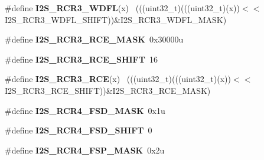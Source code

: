 \begin{DoxyCompactItemize}
\item 
\hypertarget{group___i2_s___register___masks_ga9451f98a521a64d394571a591a34add1}{}\#define {\bfseries I2\+S\+\_\+\+R\+C\+R3\+\_\+\+W\+D\+F\+L}(x)                                              ~(((uint32\+\_\+t)(((uint32\+\_\+t)(x))$<$$<$I2\+S\+\_\+\+R\+C\+R3\+\_\+\+W\+D\+F\+L\+\_\+\+S\+H\+I\+F\+T))\&I2\+S\+\_\+\+R\+C\+R3\+\_\+\+W\+D\+F\+L\+\_\+\+M\+A\+S\+K)\label{group___i2_s___register___masks_ga9451f98a521a64d394571a591a34add1}

\item 
\hypertarget{group___i2_s___register___masks_ga1609ba1986cd2320ff34a1308599c93b}{}\#define {\bfseries I2\+S\+\_\+\+R\+C\+R3\+\_\+\+R\+C\+E\+\_\+\+M\+A\+S\+K}~0x30000u\label{group___i2_s___register___masks_ga1609ba1986cd2320ff34a1308599c93b}

\item 
\hypertarget{group___i2_s___register___masks_ga1ed5dcaaac88cd06cfc10bb290c7f097}{}\#define {\bfseries I2\+S\+\_\+\+R\+C\+R3\+\_\+\+R\+C\+E\+\_\+\+S\+H\+I\+F\+T}~16\label{group___i2_s___register___masks_ga1ed5dcaaac88cd06cfc10bb290c7f097}

\item 
\hypertarget{group___i2_s___register___masks_ga8074c20580f401cbdb00cdf6859a7830}{}\#define {\bfseries I2\+S\+\_\+\+R\+C\+R3\+\_\+\+R\+C\+E}(x)                                                ~(((uint32\+\_\+t)(((uint32\+\_\+t)(x))$<$$<$I2\+S\+\_\+\+R\+C\+R3\+\_\+\+R\+C\+E\+\_\+\+S\+H\+I\+F\+T))\&I2\+S\+\_\+\+R\+C\+R3\+\_\+\+R\+C\+E\+\_\+\+M\+A\+S\+K)\label{group___i2_s___register___masks_ga8074c20580f401cbdb00cdf6859a7830}

\item 
\hypertarget{group___i2_s___register___masks_ga73d35aef97f3e91b82beb86b19b0b04f}{}\#define {\bfseries I2\+S\+\_\+\+R\+C\+R4\+\_\+\+F\+S\+D\+\_\+\+M\+A\+S\+K}~0x1u\label{group___i2_s___register___masks_ga73d35aef97f3e91b82beb86b19b0b04f}

\item 
\hypertarget{group___i2_s___register___masks_gab4d17b5f07f9c4c8ba9e25ff5352d47c}{}\#define {\bfseries I2\+S\+\_\+\+R\+C\+R4\+\_\+\+F\+S\+D\+\_\+\+S\+H\+I\+F\+T}~0\label{group___i2_s___register___masks_gab4d17b5f07f9c4c8ba9e25ff5352d47c}

\item 
\hypertarget{group___i2_s___register___masks_gadebeb77b006bfdfa2a247a1004b3ed26}{}\#define {\bfseries I2\+S\+\_\+\+R\+C\+R4\+\_\+\+F\+S\+P\+\_\+\+M\+A\+S\+K}~0x2u\label{group___i2_s___register___masks_gadebeb77b006bfdfa2a247a1004b3ed26}


\end{DoxyCompactItemize}
